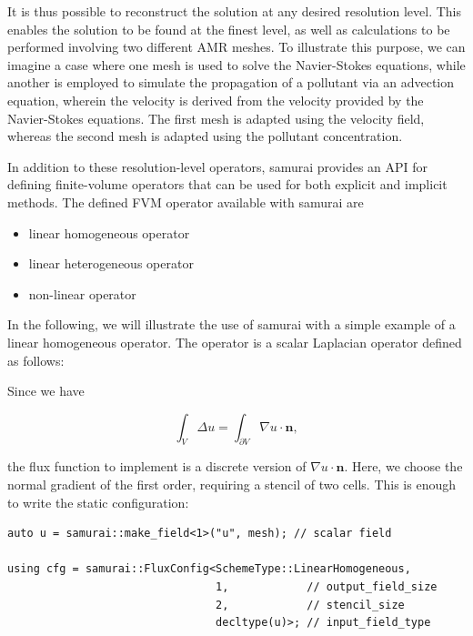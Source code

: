 It is thus possible to reconstruct the solution at any desired resolution level. This enables the solution to be found at the finest level, as well as calculations to be performed involving two different AMR meshes. To illustrate this purpose, we can imagine a case where one mesh is used to solve the Navier-Stokes equations, while another is employed to simulate the propagation of a pollutant via an advection equation, wherein the velocity is derived from the velocity provided by the Navier-Stokes equations. The first mesh is adapted using the velocity field, whereas the second mesh is adapted using the pollutant concentration.

In addition to these resolution-level operators, samurai provides an API for defining finite-volume operators that can be used for both explicit and implicit methods. The defined FVM operator available with samurai are

\begin{itemize}
    \item linear homogeneous operator
    \item linear heterogeneous operator
    \item non-linear operator
\end{itemize}

In the following, we will illustrate the use of samurai with a simple example of a linear homogeneous operator. The operator is a scalar Laplacian operator defined as follows:

Since we have

\begin{equation*}
\int_V \Delta u = \int_{\partial V} \nabla u\cdot \mathbf{n},
\end{equation*}

the flux function to implement is a discrete version of $\nabla u\cdot \mathbf{n}$.
Here, we choose the normal gradient of the first order, requiring a stencil of two cells.
This is enough to write the static configuration:

\begin{listing}[ht]
\begin{verbatim}
auto u = samurai::make_field<1>("u", mesh); // scalar field

using cfg = samurai::FluxConfig<SchemeType::LinearHomogeneous,
                                1,            // output_field_size
                                2,            // stencil_size
                                decltype(u)>; // input_field_type
\end{verbatim}
\end{listing}


